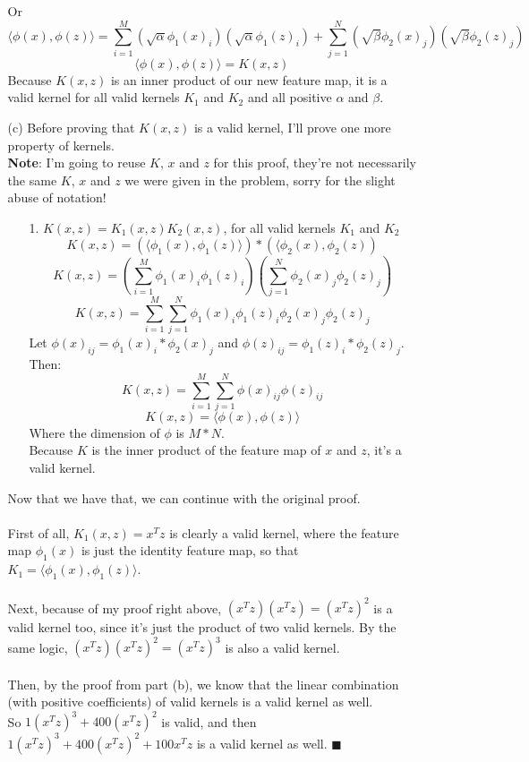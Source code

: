 \begin{enumerate}
\begin{enumerate}
      Or 
      $$\langle \phi(x), \phi(z) \rangle = \sum\limits_{i=1}^M (\sqrt\alpha \phi_1(x)_i) (\sqrt\alpha \phi_1(z)_i) + \sum\limits_{j=1}^N (\sqrt\beta \phi_2(x)_j) (\sqrt\beta \phi_2(z)_j)$$
      $$\langle \phi(x), \phi(z) \rangle = K(x,z)$$
      Because $K(x,z)$ is an inner product of our new feature map, it is a valid kernel for all valid kernels $K_1$ and $K_2$ and all positive $\alpha$ and $\beta$.\\
    \item[(c)]
      Before proving that $K(x,z)$ is a valid kernel, I'll prove one more property of kernels.\\
      \textbf{Note}: I'm going to reuse $K$, $x$ and $z$ for this proof, they're not necessarily the same $K$, $x$ and $z$ we were given in the problem, sorry for the slight abuse of notation!\\
      \begin{enumerate}
        \item[1.] $K(x,z) = K_1(x,z)K_2(x,z)$, for all valid kernels $K_1$ and $K_2$\\
          $$K(x,z) = (\langle \phi_1(x), \phi_1(z) \rangle) * (\langle \phi_2(x), \phi_2(z))$$
          $$K(x,z) = (\sum\limits_{i=1}^M \phi_1(x)_i \phi_1(z)_i)(\sum\limits_{j=1}^N \phi_2(x)_j \phi_2(z)_j)$$
          $$K(x,z) = \sum\limits_{i=1}^M \sum\limits_{j=1}^N \phi_1(x)_i \phi_1(z)_i \phi_2(x)_j \phi_2(z)_j$$
          Let $\phi(x)_{ij} = \phi_1(x)_i * \phi_2(x)_j$ and $\phi(z)_{ij} = \phi_1(z)_i * \phi_2(z)_j$. Then:
          $$K(x,z) = \sum\limits_{i=1}^M \sum\limits_{j=1}^N \phi(x)_{ij} \phi(z)_{ij}$$
          $$K(x,z) = \langle \phi(x), \phi(z) \rangle$$
          Where the dimension of $\phi$ is $M*N$.\\
          Because $K$ is the inner product of the feature map of $x$ and $z$, it's a valid kernel.
      \end{enumerate}
      Now that we have that, we can continue with the original proof.\\\\
      First of all, $K_1(x,z) = x^Tz$ is clearly a valid kernel, where the feature map $\phi_1(x)$ is just the identity feature map, so that $K_1 = \langle \phi_1(x), \phi_1(z) \rangle$.\\\\
      Next, because of my proof right above, $(x^Tz)(x^Tz) = (x^Tz)^2$ is a valid kernel too, since it's just the product of two valid kernels. By the same logic, $(x^Tz)(x^Tz)^2 = (x^Tz)^3$ is also a valid kernel.\\\\
      Then, by the proof from part (b), we know that the linear combination (with positive coefficients) of valid kernels is a valid kernel as well.\\
      So $1(x^Tz)^3 + 400(x^Tz)^2$ is valid, and then $1(x^Tz)^3 + 400(x^Tz)^2 + 100x^Tz$ is a valid kernel as well. $\blacksquare$
      

\end{enumerate}
\end{enumerate}
